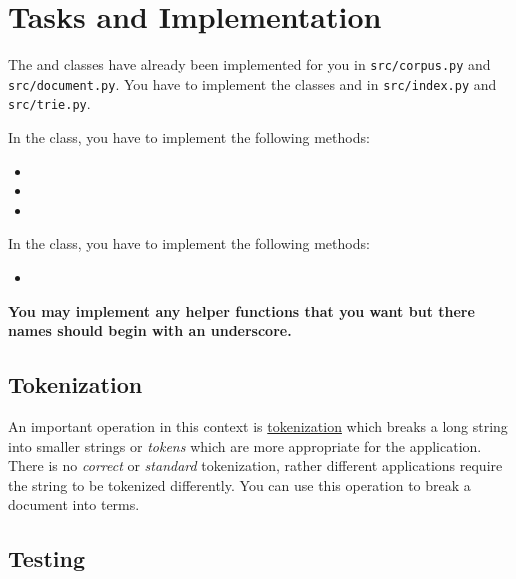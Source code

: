 \documentclass[addpoints]{exam}
\begin{document}
\section{Tasks and Implementation}
The  and  classes have already been implemented for you in \texttt{src/corpus.py} and \texttt{src/document.py}. You have to implement the classes  and  in
\texttt{src/index.py} and \texttt{src/trie.py}.

In the  class, you have to implement the following methods:
\begin{itemize}
  \item {}
  \item {}
  \item {}
\end{itemize}

In the  class, you have to implement the following methods:
\begin{itemize}
  \item {}
\end{itemize}

\textbf{You may implement any helper functions that you want but there names should begin with an underscore.}



\subsection{Tokenization}

An important operation in this context is \href{https://nlp.stanford.edu/IR-book/html/htmledition/tokenization-1.html}{tokenization} which breaks a long string into smaller strings or \textit{tokens} which are more appropriate for the application. There is no \textit{correct} or \textit{standard} tokenization, rather different applications require the string to be tokenized differently. You can use this operation to break a document into terms.

\subsection{Testing}
\end{document}
